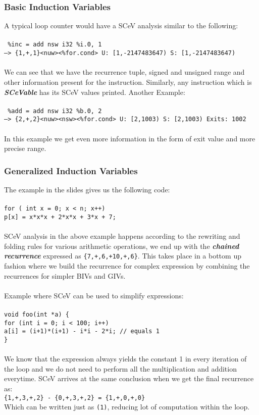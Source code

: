 \documentclass[12pt]{article}
\begin{document}
\subsubsection*{Basic Induction Variables}
A typical loop counter would have a SCeV analysis similar to the following:\\\\
\texttt{ \%inc = add nsw i32 \%i.0, 1\\
  -->  \{1,+,1\}<nuw><\%for.cond> U: [1,-2147483647) S: [1,-2147483647)}\\\\
We can see that we have the recurrence tuple, signed and unsigned range and other information present for the instruction. Similarly, any instruction which is \textbf{\textit{SCeVable}} has its SCeV values printed.
Another Example:\\\\
\texttt{  \%add = add nsw i32 \%b.0, 2\\
  -->  \{2,+,2\}<nuw><nsw><\%for.cond> U: [2,1003) S: [2,1003)		Exits: 1002}\\\\
In this example we get even more information in the form of exit value and more precise range.
\newpage
\subsubsection*{Generalized Induction Variables}
The example in the slides gives us the following code:\\\\
\texttt{for ( int x = 0; x < n; x++)\\
p[x] = x*x*x + 2*x*x + 3*x + 7;}\\\\
SCeV analysis in the above example happens according to the rewriting and folding rules for various arithmetic operations, we end up with the \textbf{\textit{chained recurrence}} expressed as  \texttt{\{7,+,6,+10,+,6\}}. This takes place in a bottom up fashion where we build the recurrence for complex expression by combining the recurrences for simpler BIVs and GIVs.\\\\
Example where SCeV can be used to simplify expressions:\\\\
\texttt{void foo(int *a) \{\\
for (int i = 0; i < 100; i++)\\
a[i] = (i+1)*(i+1) - i*i - 2*i; // equals 1\\
\}}\\\\
We know that the expression always yields the constant 1 in every iteration of the loop and we do not need to perform all the multiplication and addition everytime. SCeV arrives at the same conclusion when we get the final recurrence as:\\
\texttt{\{1,+,3,+,2\} - \{0,+,3,+,2\} = \{1,+,0,+,0\}}\\
Which can be written just as \texttt{(1)}, reducing lot of computation within the loop.
\end{document}
